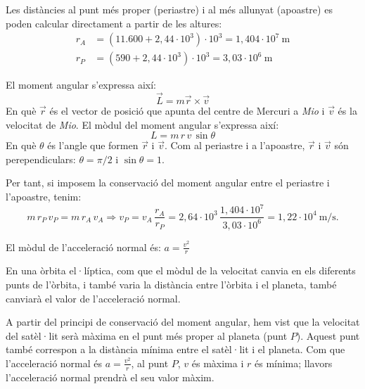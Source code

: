 \begin{solapartat}
 Les distàncies al punt més proper (periastre) i al més allunyat (apoastre) es poden calcular directament a partir de les altures:
\begin{align*}
r_A &= (11.600 + 2,44\cdot 10^{3})\cdot 10^{3} = 1,404\cdot 10^{7}\ \mathrm{m}\\
r_P &= (590 + 2,44\cdot 10^{3})\cdot 10^{3} = 3,03\cdot 10^{6}\ \mathrm{m}
\end{align*}

El moment angular s'expressa així:
\[ \vec{L} = m\vec{r}\times\vec{v} \]
En què $\vec{r}$ és el vector de posició que apunta del centre de Mercuri a \textit{Mio} i $\vec{v}$ és la velocitat de \textit{Mio}. El mòdul del moment angular s'expressa així:
\[ L = m\,r\,v\,\sin\theta \]
En què $\theta$ és l'angle que formen $\vec{r}$ i $\vec{v}$. Com al periastre i a l'apoastre, $\vec{r}$ i $\vec{v}$ són perependiculars: $\theta = \pi/2$ i $\sin\theta = 1$.

Per tant, si imposem la conservació del moment angular entre el periastre i l'apoastre, tenim:
\[ m\,r_P\,v_P = m\,r_A\,v_A \Rightarrow v_P = v_A\,\frac{r_A}{r_P} = 2,64\cdot 10^{3}\,\frac{1,404\cdot 10^{7}}{3,03\cdot 10^{6}} = 1,22\cdot 10^{4}\ \mathrm{m/s}. \]

 El mòdul de l'acceleració normal és: $a = \frac{v^2}{r}$

En una òrbita el·líptica, com que el mòdul de la velocitat canvia en els diferents punts de l'òrbita, i també varia la distància entre l'òrbita i el planeta, també canviarà el valor de l'acceleració normal.

A partir del principi de conservació del moment angular, hem vist que la velocitat del satèl·lit serà màxima en el punt més proper al planeta (punt $P$). Aquest punt també correspon a la distància mínima entre el satèl·lit i el planeta. Com que l'acceleració normal és $a = \frac{v^2}{r}$, al punt $P$, $v$ és màxima i $r$ és mínima; llavors l'acceleració normal prendrà el seu valor màxim.
\end{solapartat}
